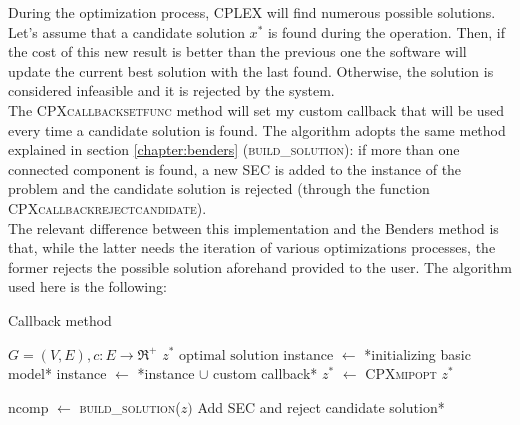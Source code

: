During the optimization process, CPLEX will find numerous possible solutions. \\Let’s assume that a candidate solution $x^*$ is found during the operation. Then, if the cost of this new result is better than the previous one the software will update the current best solution with the last found. Otherwise, the solution is considered infeasible and it is rejected by the system.\\
The \textsc{CPXcallbacksetfunc} method will set my custom callback that will be used every time a candidate solution is found. The algorithm adopts the same method explained in section \ref{chapter:benders} (\textsc{build\_solution}): if more than one connected component is found, a new SEC is added to the instance of the problem and the candidate solution is rejected (through the function \textsc{CPXcallbackrejectcandidate}).\\
The relevant difference between this implementation and the Benders method is that, while the latter needs the iteration of various optimizations processes, the former rejects the possible solution aforehand provided to the user.
The algorithm used here is the following:
\begin{algorithm}
	\caption{Callback method}\label{algo:callback}
	\begin{algorithmic}[1]
		\Require $G=(V,E), c:E\rightarrow \Re^+$
		\Ensure $z^*\text{ optimal solution}$
		\State instance $\gets$ *initializing basic model*
		\State instance $\gets$ *instance $\cup$ custom callback*
		\State $z^*$ $\gets$ \textsc{CPXmipopt}
		\State \Return $z^*$
		\EndProcedure
		
			\State ncomp $\gets$ \textsc{build\_solution}($z)$
				\State *Add SEC and reject candidate solution*
			\EndIf
			\State \Return
		\EndProcedure
		
	\end{algorithmic}
\end{algorithm}